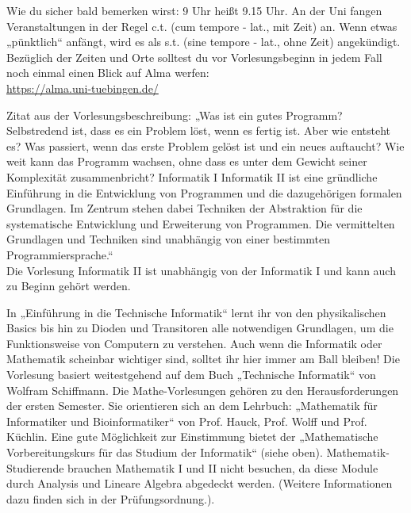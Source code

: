 
Wie du sicher bald bemerken wirst: 9 Uhr heißt 9.15 Uhr. An der Uni fangen Veranstaltungen in der Regel c.t. (cum
tempore - lat., mit Zeit) an. Wenn etwas „pünktlich“ anfängt, wird es als s.t. (sine tempore - lat., ohne
Zeit) angekündigt.
Bezüglich der Zeiten und Orte solltest du vor Vorlesungsbeginn in jedem Fall noch einmal einen Blick auf Alma werfen:\\
\url{https://alma.uni-tuebingen.de/}

\ifbachelor
\pagebreak
{}
Zitat aus der Vorlesungsbeschreibung: „Was ist ein gutes Programm? Selbstredend ist, dass es ein
Problem löst, wenn es fertig ist. Aber wie entsteht es? Was passiert, wenn das erste Problem gelöst
ist und ein neues auftaucht? Wie weit kann das Programm wachsen, ohne dass es unter dem Gewicht
seiner Komplexität zusammenbricht? 
\ifwintersemester
Informatik I 
\fi
\ifsommersemester
Informatik II
\fi 
ist eine gründliche Einführung in die Entwicklung
von Programmen und die dazugehörigen formalen Grundlagen. Im Zentrum stehen dabei Techniken der Abstraktion
für die systematische Entwicklung und Erweiterung von Programmen. Die vermittelten Grundlagen und Techniken
sind unabhängig von einer bestimmten Programmiersprache.“\\
\ifsommersemester
Die Vorlesung Informatik II ist unabhängig von der Informatik I und kann auch zu Beginn gehört werden.
\fi

\ifinfo
\ifwintersemester
{}
In „Einführung in die Technische Informatik“ lernt ihr von den physikalischen Basics bis hin zu Dioden und Transitoren alle notwendigen Grundlagen, um die Funktionsweise von Computern zu verstehen. Auch wenn die Informatik oder Mathematik scheinbar wichtiger sind, solltet ihr hier immer am Ball bleiben! Die Vorlesung basiert weitestgehend auf dem Buch „Technische Informatik“ von Wolfram Schiffmann.
\fi
\fi
{}
Die Mathe-Vorlesungen gehören zu den Herausforderungen der ersten Semester. Sie orientieren
sich an dem Lehrbuch: „Mathematik für Informatiker und Bioinformatiker“ von Prof.
Hauck, Prof. Wolff und Prof. Küchlin. Eine gute Möglichkeit zur Einstimmung bietet der „Mathematische
Vorbereitungskurs für das Studium der Informatik“ (siehe oben).
\iflehramt
Mathematik-Studierende brauchen Mathematik I
und II nicht besuchen, da diese Module durch Analysis und Lineare Algebra
abgedeckt werden. (Weitere Informationen dazu finden sich in der Prüfungsordnung.).
\fi
\fi

